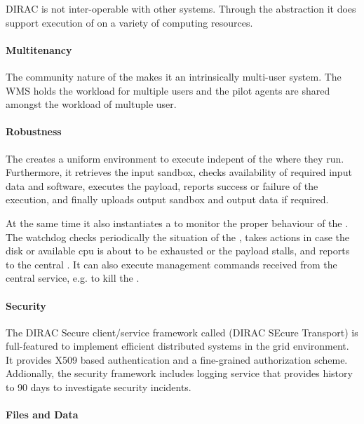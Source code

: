 \documentclass{sig-alternate}
\begin{document}
DIRAC is not inter-operable with other \pilot systems.
Through the  abstraction it does support execution of
\pilots on a variety of computing resources.

\paragraph{Multitenancy}

The community nature of the  makes it an intrinsically
multi-user system.
The WMS holds the workload for multiple users and the pilot agents are shared
amongst the workload of multuple user.

\paragraph{Robustness}

The  creates a uniform environment to execute
 indepent of the  where they run.
Furthermore, it retrieves the input sandbox, checks availability of required
input data and software, executes the payload, reports success or failure of
the execution, and finally uploads output sandbox and output data if required.

At the same time it also instantiates a  to monitor the
proper behaviour of the .
The watchdog checks periodically the situation of the ,
takes actions in case the disk or available cpu is about to be exhausted or the
payload stalls, and reports to the central .
It can also execute management commands received from the central service, e.g.
to kill the .

\paragraph{Security}

The DIRAC Secure client/service framework called  (DIRAC
SEcure Transport) is full-featured to implement efficient distributed systems
in the grid environment\cite{}.
It provides X509 based authentication and a fine-grained authorization scheme.
Addionally, the security framework includes logging service that provides
history to 90 days to investigate security incidents.

\paragraph{Files and Data}
\end{document}
